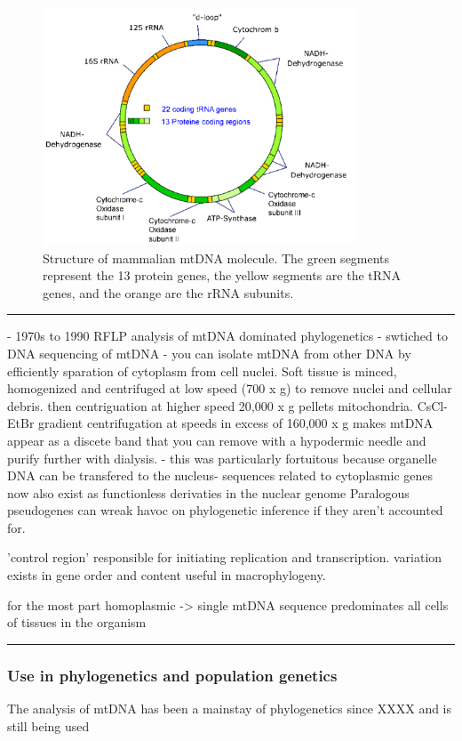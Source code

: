 \documentclass[11pt, oneside]{article}
\begin{document}
\begin{figure}[H]
\begin{center}
    \includegraphics[width=25em]{images/mtDNA.pdf}   
    \caption{Structure of mammalian mtDNA molecule. The green segments represent the 13 protein genes,
the yellow segments are the tRNA genes, and the orange are the rRNA subunits.}
    \label{fig:mtDNA}
\end{center}
\end{figure}

\hrule

- 1970s to 1990 RFLP analysis of mtDNA dominated phylogenetics
- swtiched to DNA sequencing of mtDNA
- you can isolate mtDNA from other DNA by efficiently sparation of cytoplasm from cell nuclei.
Soft tissue is minced, homogenized and centrifuged at low speed (700 x g) to remove nuclei and cellular debris.
then centriguation at higher speed 20,000 x g pellets mitochondria.
CsCl-EtBr gradient centrifugation at speeds in excess of 160,000 x g makes mtDNA appear as a discete band 
that you can remove with a hypodermic needle and purify further with dialysis. 
- this was particularly fortuitous because organelle DNA can be transfered to the nucleus- sequences 
related to cytoplasmic genes now also exist as functionless derivaties in the nuclear genome 
Paralogous pseudogenes can wreak havoc on phylogenetic inference if they aren't accounted for. 

'control region' responsible for initiating replication and transcription.
variation exists in gene order and content useful in macrophylogeny. 

for the most part homoplasmic -> single mtDNA sequence predominates all cells of tissues in the 
organism



\hrule

\subsubsection{Use in phylogenetics and population genetics}
The analysis of mtDNA has been a mainstay of phylogenetics since XXXX and is still being used 
\end{document}
